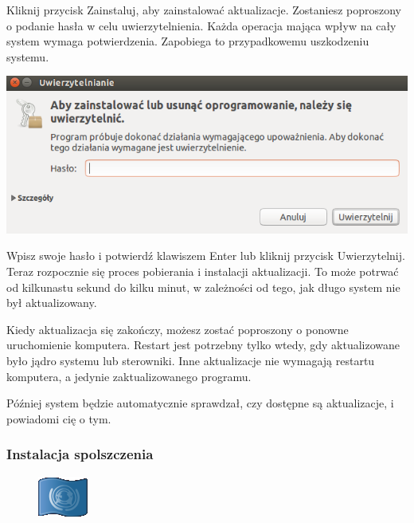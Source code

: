 Kliknij przycisk \textcolor{ubuntu_orange}{Zainstaluj}, aby zainstalować aktualizacje. Zostaniesz poproszony o podanie hasła w celu uwierzytelnienia. Każda operacja mająca wpływ na cały system wymaga potwierdzenia. Zapobiega to przypadkowemu uszkodzeniu systemu.
\begin{center}
	\vspace{-10pt}
	\includegraphics{images/unity_uwierzytelnienie.png}
\end{center}

Wpisz swoje hasło i potwierdź klawiszem Enter lub kliknij przycisk \textcolor{ubuntu_orange}{Uwierzytelnij}. Teraz rozpocznie się proces pobierania i instalacji aktualizacji. To może potrwać od kilkunastu sekund do kilku minut, w zależności od tego, jak długo system nie był aktualizowany.

Kiedy aktualizacja się zakończy, możesz zostać poproszony o ponowne uruchomienie komputera. Restart jest potrzebny tylko wtedy, gdy aktualizowane było jądro systemu lub sterowniki. Inne aktualizacje nie wymagają restartu komputera, a jedynie zaktualizowanego programu.

Później system będzie automatycznie sprawdzał, czy dostępne są aktualizacje, i powiadomi cię o tym.

\subsubsection{Instalacja spolszczenia}
\begin{figure}
	\vspace{-10pt}
	\includegraphics[width=\linewidth]{images/pierwsze_uruchomienie_lang1.png}
\end{figure}

